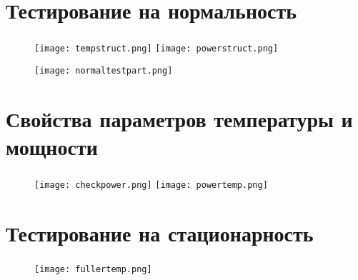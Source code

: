 \section{Тестирование на нормальность}

\begin{frame}
\frametitle{\insertsection}

\begin{figure}
    \center
    \texttt{[image: tempstruct.png]}
    \texttt{[image: powerstruct.png]}
\end{figure}

\begin{figure}
    \center
    \texttt{[image: normaltestpart.png]}
\end{figure}

\end{frame}



\section{Свойства параметров температуры и мощности}

\begin{frame}
\frametitle{\insertsection}

\begin{figure}
    \center
    \texttt{[image: checkpower.png]}
    \texttt{[image: powertemp.png]}
\end{figure}


\end{frame}



\section{Тестирование на стационарность}

\begin{frame}
\frametitle{\insertsection}

\begin{figure}
    \center
    \texttt{[image: fullertemp.png]}
\end{figure}

\end{frame}



